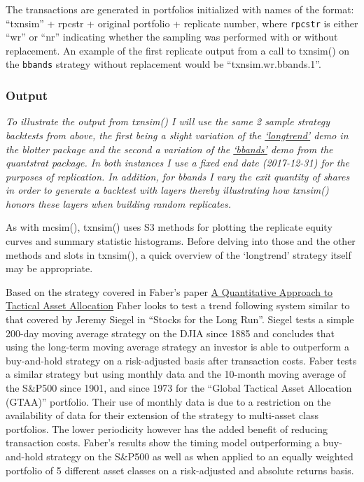 The transactions are generated in portfolios initialized with names of
the format: ``txnsim'' + rpcstr + original portfolio + replicate number,
where \texttt{rpcstr} is either ``wr'' or ``nr'' indicating whether the
sampling was performed with or without replacement. An example of the
first replicate output from a call to txnsim() on the \texttt{bbands}
strategy without replacement would be ``txnsim.wr.bbands.1''.

\hypertarget{output}{%
\subsubsection{Output}\label{output}}

\emph{To illustrate the output from txnsim() I will use the same 2
sample strategy backtests from above, the first being a slight variation
of the
\href{https://github.com/braverock/blotter/blob/master/demo/longtrend.R}{`longtrend'}
demo in the blotter package and the second a variation of the
\href{https://github.com/braverock/quantstrat/blob/master/demo/bbands.R}{`bbands'}
demo from the quantstrat package. In both instances I use a fixed end
date (2017-12-31) for the purposes of replication. In addition, for
bbands I vary the exit quantity of shares in order to generate a
backtest with layers thereby illustrating how txnsim() honors these
layers when building random replicates.}

As with mcsim(), txnsim() uses S3 methods for plotting the replicate
equity curves and summary statistic histograms. Before delving into
those and the other methods and slots in txnsim(), a quick overview of
the `longtrend' strategy itself may be appropriate.

Based on the strategy covered in Faber's paper
\href{https://papers.ssrn.com/sol3/papers.cfm?abstract_id=962461}{A
Quantitative Approach to Tactical Asset Allocation} Faber looks to test
a trend following system similar to that covered by Jeremy Siegel in
``Stocks for the Long Run''. Siegel tests a simple 200-day moving
average strategy on the DJIA since 1885 and concludes that using the
long-term moving average strategy an investor is able to outperform a
buy-and-hold strategy on a risk-adjusted basis after transaction costs.
Faber tests a similar strategy but using monthly data and the 10-month
moving average of the S\&P500 since 1901, and since 1973 for the
``Global Tactical Asset Allocation (GTAA)'' portfolio. Their use of
monthly data is due to a restriction on the availability of data for
their extension of the strategy to multi-asset class portfolios. The
lower periodicity however has the added benefit of reducing transaction
costs. Faber's results show the timing model outperforming a
buy-and-hold strategy on the S\&P500 as well as when applied to an
equally weighted portfolio of 5 different asset classes on a
risk-adjusted and absolute returns basis.

